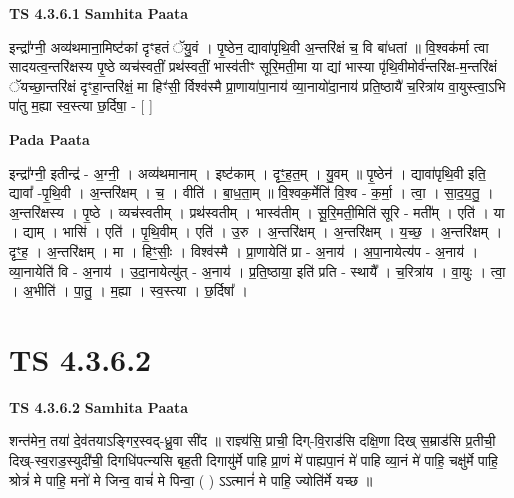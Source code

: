 \documentclass[17pt]{extarticle}
\begin{document}
\textbf{TS 4.3.6.1 } \newline
\textbf{Samhita Paata} \newline

इन्द्रा᳚ग्नी॒ अव्य॑थमाना॒मिष्ट॑कां दृꣳहतं ॅयु॒वं । पृ॒ष्ठेन॒ द्यावा॑पृथि॒वी अ॒न्तरि॑क्षं च॒ वि बा॑धतां ॥ वि॒श्वक॑र्मा त्वा सादयत्व॒न्तरि॑क्षस्य पृ॒ष्ठे व्यच॑स्वतीं॒ प्रथ॑स्वतीं॒ भास्व॑तीꣳ सूरि॒मती॒मा या द्यां भास्या पृ॑थि॒वीमोर्व॑न्तरि॑क्ष-म॒न्तरि॑क्षं ॅयच्छा॒न्तरि॑क्षं दृꣳहा॒न्तरि॑क्षं॒ मा हिꣳ॑सी॒ र्विश्व॑स्मै प्रा॒णाया॑पा॒नाय॑ व्या॒नायो॑दा॒नाय॑ प्रति॒ष्ठायै॑ च॒रित्रा॑य वा॒युस्त्वा॒ऽभि पा॑तु म॒ह्या स्व॒स्त्या छ॒र्दिषा॒ - [  ] \newline

\textbf{Pada Paata} \newline

इन्द्रा᳚ग्नी॒ इतीन्द्र॑ - अ॒ग्नी॒ । अव्य॑थमानाम् । इष्ट॑काम् । दृꣳ॒॒ह॒त॒म् । यु॒वम् ॥ पृ॒ष्ठेन॑ । द्यावा॑पृथि॒वी इति॒ द्यावा᳚ -पृ॒थि॒वी । अ॒न्तरि॑क्षम् । च॒ । वीति॑ । बा॒ध॒ता॒म् ॥ वि॒श्वक॒र्मेति॑ वि॒श्व - क॒र्मा॒ । त्वा॒ । सा॒द॒य॒तु॒ । अ॒न्तरि॑क्षस्य । पृ॒ष्ठे । व्यच॑स्वतीम् । प्रथ॑स्वतीम् । भास्व॑तीम् । सू॒रि॒मती॒मिति॑ सूरि - मती᳚म् । एति॑ । या । द्याम् । भासि॑ । एति॑ । पृ॒थि॒वीम् । एति॑ । उ॒रु । अ॒न्तरि॑क्षम् । अ॒न्तरि॑क्षम् । य॒च्छ॒ । अ॒न्तरि॑क्षम् । दृꣳ॒॒ह॒ । अ॒न्तरि॑क्षम् । मा । हिꣳ॒॒सीः॒ । विश्व॑स्मै । प्रा॒णायेति॑ प्रा - अ॒नाय॑ । अ॒पा॒नायेत्य॑प - अ॒नाय॑ । व्या॒नायेति॑ वि - अ॒नाय॑ । उ॒दा॒नायेत्यु॑त् - अ॒नाय॑ । प्र॒ति॒ष्ठाया॒ इति॑ प्रति - स्थायै᳚ । च॒रित्रा॑य । वा॒युः । त्वा॒ । अ॒भीति॑ । पा॒तु॒ । म॒ह्या । स्व॒स्त्या । छ॒र्दिषा᳚ ।  \newline





\section{ TS 4.3.6.2 }

\textbf{TS 4.3.6.2 } \newline
\textbf{Samhita Paata} \newline

शन्त॑मेन॒ तया॑ दे॒व॑तयाऽङ्गिर॒स्वद्-ध्रु॒वा सी॑द ॥ राज्ञ्य॑सि॒ प्राची॒ दिग्-वि॒राड॑सि दक्षि॒णा दिख् स॒म्राड॑सि प्र॒तीची॒ दिख्-स्व॒राड॒स्युदी॑ची॒ दिगधि॑पत्न्यसि बृह॒ती दिगायु॑र्मे पाहि प्रा॒णं मे॑ पाह्यपा॒नं मे॑ पाहि व्या॒नं मे॑ पाहि॒ चक्षु॑र्मे पाहि॒ श्रोत्रं॑ मे पाहि॒ मनो॑ मे जिन्व॒ वाचं॑ मे पिन्वा॒ ( ) ऽऽत्मानं॑ मे पाहि॒ ज्योति॑र्मे यच्छ ॥ \newline
\end{document}
